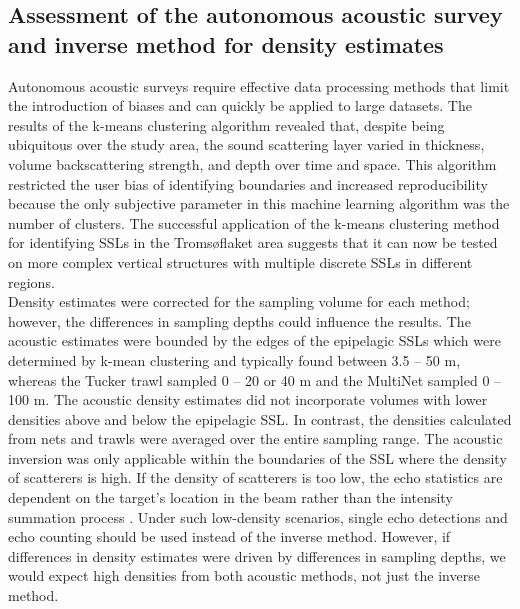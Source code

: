 \subsection{Assessment of the autonomous acoustic survey and inverse method for density estimates}
Autonomous acoustic surveys require effective data processing methods that limit the introduction of biases and can quickly be applied to large datasets. The results of the k-means clustering algorithm revealed that, despite being ubiquitous over the study area, the sound scattering layer varied in thickness, volume backscattering strength, and depth over time and space. This algorithm restricted the user bias of identifying boundaries and increased reproducibility because the only subjective parameter in this machine learning algorithm was the number of clusters. The successful application of the k-means clustering method for identifying SSLs in the Tromsøflaket area suggests that it can now be tested on more complex vertical structures with multiple discrete SSLs in different regions. \\
Density estimates were corrected for the sampling volume for each method; however, the differences in sampling depths could influence the results. The acoustic estimates were bounded by the edges of the epipelagic SSLs which were determined by k-mean clustering and typically found between 3.5 – 50 m, whereas the Tucker trawl sampled 0 – 20 or 40 m and the MultiNet sampled 0 – 100 m. The acoustic density estimates did not incorporate volumes with lower densities above and below the epipelagic SSL. In contrast, the densities calculated from nets and trawls were averaged over the entire sampling range. The acoustic inversion was only applicable within the boundaries of the SSL where the density of scatterers is high. If the density of scatterers is too low, the echo statistics are dependent on the target's location in the beam rather than the intensity summation process \citep{Holliday1995}. Under such low-density scenarios, single echo detections and echo counting \citep{Kieser1984, Simmonds2008} should be used instead of the inverse method. However, if differences in density estimates were driven by differences in sampling depths, we would expect high densities from both acoustic methods, not just the inverse method.

